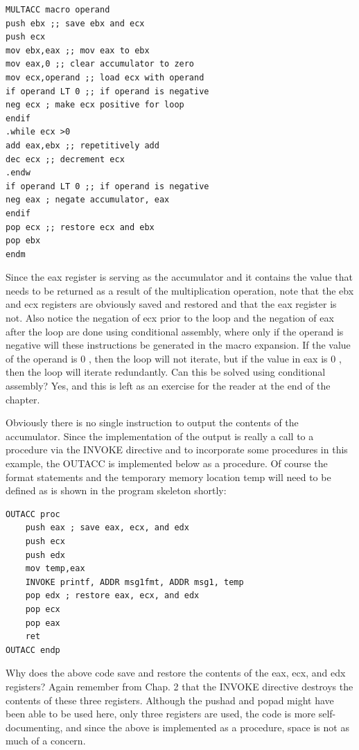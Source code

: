 \documentclass[10pt]{book}
\begin{document}
\begin{center}
\begin{center}
\begin{verbatim}
MULTACC macro operand
push ebx ;; save ebx and ecx
push ecx
mov ebx,eax ;; mov eax to ebx
mov eax,0 ;; clear accumulator to zero
mov ecx,operand ;; load ecx with operand
if operand LT 0 ;; if operand is negative
neg ecx ; make ecx positive for loop
endif
.while ecx >0
add eax,ebx ;; repetitively add
dec ecx ;; decrement ecx
.endw
if operand LT 0 ;; if operand is negative
neg eax ; negate accumulator, eax
endif
pop ecx ;; restore ecx and ebx
pop ebx
endm
\end{verbatim}

Since the eax register is serving as the accumulator and it contains the value that needs to be returned as a result of the multiplication operation, note that the ebx and ecx registers are obviously saved and restored and that the eax register is not. Also notice the negation of ecx prior to the loop and the negation of eax after the loop are done using conditional assembly, where only if the operand is negative will these instructions be generated in the macro expansion. If the value of the operand is 0 , then the loop will not iterate, but if the value in eax is 0 , then the loop will iterate redundantly. Can this be solved using conditional assembly? Yes, and this is left as an exercise for the reader at the end of the chapter.


Obviously there is no single instruction to output the contents of the accumulator. Since the implementation of the output is really a call to a procedure via the INVOKE directive and to incorporate some procedures in this example, the OUTACC is implemented below as a procedure. Of course the format statements and the temporary memory location temp will need to be defined as is shown in the program skeleton shortly:

\begin{verbatim}
OUTACC proc
    push eax ; save eax, ecx, and edx
    push ecx
    push edx
    mov temp,eax
    INVOKE printf, ADDR msg1fmt, ADDR msg1, temp
    pop edx ; restore eax, ecx, and edx
    pop ecx
    pop eax
    ret
OUTACC endp
\end{verbatim}

Why does the above code save and restore the contents of the eax, ecx, and edx registers? Again remember from Chap. 2 that the INVOKE directive destroys the contents of these three registers. Although the pushad and popad might have been able to be used here, only three registers are used, the code is more self-documenting, and since the above is implemented as a procedure, space is not as much of a concern.


\end{center}
\end{center}
\end{document}

